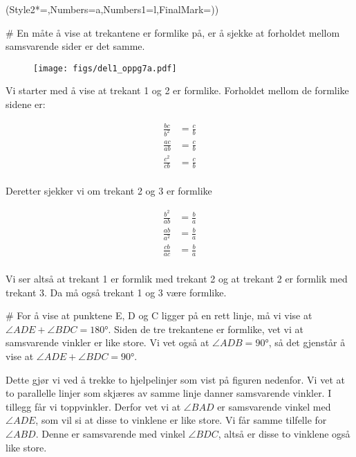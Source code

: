 \begin{easylist}[enumerate]
	\ListProperties(Style2*=,Numbers=a,Numbers1=l,FinalMark={)})
	
	# En måte å vise at trekantene er formlike på, er å sjekke at forholdet mellom samsvarende sider er det samme. 
	
	\begin{figure}[ht!]
		\centering
		\texttt{[image: figs/del1\_oppg7a.pdf]}
		\label{fig:del1_oppg7a}
	\end{figure}	
	
		Vi starter med å vise at trekant 1 og 2 er formlike. Forholdet mellom de formlike sidene er:
		
	
	\begin{equation*}
		\begin{aligned}
			\frac{bc}{b^2} & = \frac{c}{b} \\
			\frac{ac}{ab} & = \frac{c}{b} \\
			\frac{c^2}{cb} & = \frac{c}{b} \\			
		\end{aligned}
	\end{equation*}
	
	Deretter sjekker vi om trekant 2 og 3 er formlike
	
	\begin{equation*}
		\begin{aligned}
			\frac{b^2}{ab} & = \frac{b}{a} \\
			\frac{ab}{a^2} & = \frac{b}{a} \\
			\frac{cb}{ac} & = \frac{b}{a} \\			
		\end{aligned}
	\end{equation*}
	
	Vi ser altså at trekant 1 er formlik med trekant 2 og at trekant 2 er formlik med trekant 3. Da må også trekant 1 og 3 være formlike. 
	
	# For å vise at punktene E, D og C ligger på en rett linje, må vi vise at $\angle ADE + \angle BDC = \ang{180} $. Siden de tre trekantene er formlike, vet vi at samsvarende vinkler er like store. Vi vet også at $\angle ADB = \ang{90}$, så det gjenstår å vise at $\angle ADE + \angle BDC = \ang{90}$.
	
	Dette gjør vi ved å trekke to hjelpelinjer som vist på figuren nedenfor. Vi vet at to parallelle linjer som skjæres av samme linje danner samsvarende vinkler. I tillegg får vi toppvinkler. Derfor vet vi at $\angle BAD$ er samsvarende vinkel med $\angle ADE$, som vil si at disse to vinklene er like store. Vi får samme tilfelle for $\angle ABD$. Denne er samsvarende med vinkel $\angle BDC$, altså er disse to vinklene også like store.
	

\end{easylist}
